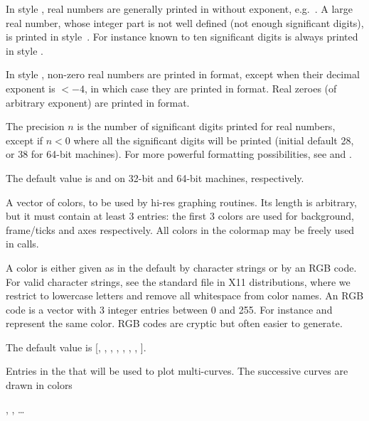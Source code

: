 {\item In style , real numbers are generally printed in  without exponent, e.g.~. A large
real number, whose integer part is not well defined (not enough significant
digits), is printed in style~. For instance  known to
ten significant digits is always printed in style .

\item In style , non-zero real numbers are printed in  format,
except when their decimal exponent is $< -4$, in which case they are printed in
 format. Real zeroes (of arbitrary exponent) are printed in 
format.

The precision $n$ is the number of significant digits printed for real
numbers, except if $n<0$ where all the significant digits will be printed
(initial default 28, or 38 for 64-bit machines). For more powerful formatting
possibilities, see  and .

The default value is  and  on 32-bit and
64-bit machines, respectively.

\label{se:def,graphcolormap}
A vector of colors, to be
used by hi-res graphing routines. Its length is arbitrary, but it must
contain at least 3 entries: the first 3 colors are used for background,
frame/ticks and axes respectively. All colors in the colormap may be freely
used in  calls.

A color is either given as in the default by character strings or by an RGB
code. For valid character strings, see the standard  file in X11
distributions, where we restrict to lowercase letters and remove all
whitespace from color names. An RGB code is a vector with 3 integer entries
between 0 and 255. For instance \kbd{[250, 235, 215]} and
 represent the same color. RGB codes are cryptic but
often easier to generate.

The default value is [, , ,
, , , ,
].

\label{se:def,graphcolors}
Entries in the
 that will be used to plot multi-curves. The successive
curves are drawn in colors

, ,
  \dots

}
